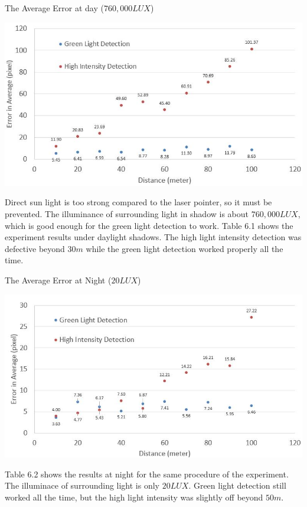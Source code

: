 \begin{table}[ht!]
\begin{center}
\caption{The Average Error at day ($760,000LUX$)}
\includegraphics[scale = 0.6]{pics/dataday.jpg}
\end{center}
\end{table}

Direct sun light is too strong compared to the laser pointer, so it must be prevented. The illuminance of surrounding light in shadow is about $760,000LUX$, which is good enough for the green light detection to work. Table 6.1 shows the experiment results under daylight shadows. The high light intensity detection was defective beyond $30m$ while the green light detection worked properly all the time.  


\begin{table}[ht!]
\begin{center}
\caption{The Average Error at Night ($20LUX$)}
\includegraphics[scale = 0.6]{pics/datanight.jpg}
\end{center}
\end{table}

Table 6.2 shows the results at night for the same procedure of the experiment. The illuminace of surrounding light is only $20LUX$. Green light detection still worked all the time, but the high light intensity was slightly off beyond $50m$.

